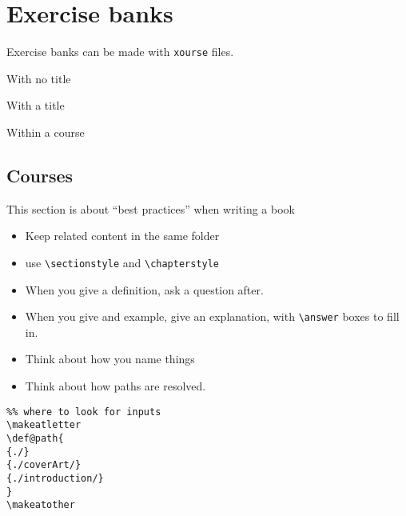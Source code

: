 \documentclass{ximera}
\begin{document}
\section{Exercise banks}

Exercise banks can be made with \verb!xourse! files.

With no title

With a title

Within a course

\onecolumn
\begin{multicols}{2}
  \section{Courses}

  This section is about ``best practices'' when writing a book
  \begin{itemize}
    \item Keep related content in the same folder
    \item use \texttt{\textbackslash sectionstyle} and
          \texttt{\textbackslash chapterstyle}
    \item When you give a definition, ask a question after.
    \item When you give and example, give an explanation, with
          \texttt{\textbackslash answer} boxes to fill in.
    \item Think about how you name things
    \item Think about how paths are resolved.
  \end{itemize}

\begin{verbatim} 
%% where to look for inputs
\makeatletter
\def@path{
{./}
{./coverArt/}
{./introduction/}
}
\makeatother   
\end{verbatim}
\end{multicols}
\end{document}
